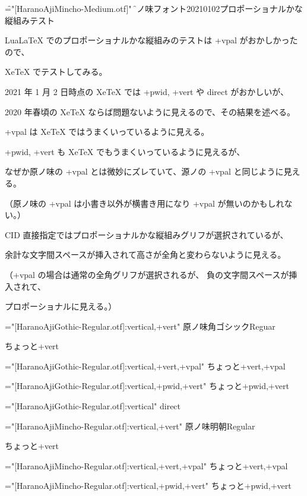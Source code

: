 

\font\f="[HaranoAjiMincho-Medium.otf]"
\f

原ノ味フォント20210102プロポーショナルかな縦組みテスト

LuaLaTeX でのプロポーショナルかな縦組みのテストは +vpal がおかしかったので、

XeTeX でテストしてみる。

2021 年 1 月 2 日時点の XeTeX では +pwid, +vert や direct がおかしいが、

2020 年春頃の XeTeX ならば問題ないように見えるので、その結果を述べる。

+vpal は XeTeX ではうまくいっているように見える。

+pwid, +vert も XeTeX でもうまくいっているように見えるが、

なぜか原ノ味の +vpal とは微妙にズレていて、源ノの +vpal と同じように見える。

（原ノ味の +vpal は小書き以外が横書き用になり +vpal が無いのかもしれない。）

CID 直接指定ではプロポーショナルかな縦組みグリフが選択されているが、

余計な文字間スペースが挿入されて高さが全角と変わらないように見える。

（+vpal の場合は通常の全角グリフが選択されるが、
負の文字間スペースが挿入されて、

プロポーショナルに見える。）

\font\hgr="[HaranoAjiGothic-Regular.otf]:vertical,+vert"
\hgr
原ノ味角ゴシックReguar

ちょっと+vert

\font\hgrvpal="[HaranoAjiGothic-Regular.otf]:vertical,+vert,+vpal"
\hgrvpal
ちょっと+vert,+vpal

\font\hgrpwidvert="[HaranoAjiGothic-Regular.otf]:vertical,+pwid,+vert"
\hgrpwidvert
ちょっと+pwid,+vert

\font\hgrdirect="[HaranoAjiGothic-Regular.otf]:vertical"
\hgrdirect
{}%
direct

\font\hmr="[HaranoAjiMincho-Regular.otf]:vertical,+vert"
\hmr
原ノ味明朝Regular

ちょっと+vert

\font\hmrvpal="[HaranoAjiMincho-Regular.otf]:vertical,+vert,+vpal"
\hmrvpal
ちょっと+vert,+vpal

\font\hmrpwidvert="[HaranoAjiMincho-Regular.otf]:vertical,+pwid,+vert"
\hmrpwidvert
ちょっと+pwid,+vert


